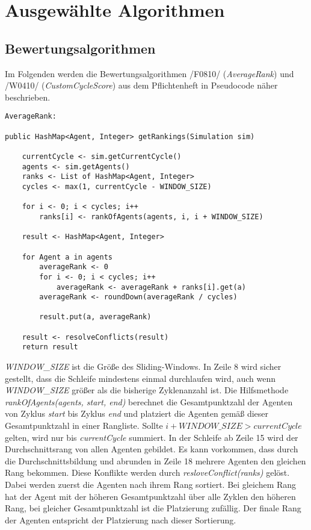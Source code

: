 \chapter{Ausgewählte Algorithmen}

\section{Bewertungsalgorithmen}

Im Folgenden werden die Bewertungsalgorithmen /F0810/ (\emph{AverageRank}) und /W0410/ (\emph{CustomCycleScore}) aus dem Pflichtenheft in Pseudocode näher beschrieben. 

\begin{lstlisting}
AverageRank:

public HashMap<Agent, Integer> getRankings(Simulation sim) 
	
	currentCycle <- sim.getCurrentCycle()
	agents <- sim.getAgents()
	ranks <- List of HashMap<Agent, Integer>	
	cycles <- max(1, currentCycle - WINDOW_SIZE)
	
	for i <- 0; i < cycles; i++ 
		ranks[i] <- rankOfAgents(agents, i, i + WINDOW_SIZE)
	
	result <- HashMap<Agent, Integer>	
	
	for Agent a in agents
		averageRank <- 0
		for i <- 0; i < cycles; i++
			averageRank <- averageRank + ranks[i].get(a)
		averageRank <- roundDown(averageRank / cycles)
		
		result.put(a, averageRank)
	
	result <- resolveConflicts(result)
	return result
\end{lstlisting}
\emph{WINDOW\_SIZE} ist die Größe des Sliding-Windows. In Zeile 8 wird sicher gestellt, dass die Schleife mindestens einmal durchlaufen wird, auch wenn \emph{WINDOW\_SIZE} größer als die bisherige Zyklenanzahl ist.
Die Hilfsmethode \emph{rankOfAgents(agents, start, end)} berechnet die Gesamtpunktzahl der Agenten von Zyklus \emph{start} bis Zyklus \emph{end} und platziert die Agenten gemäß dieser Gesamtpunktzahl in einer Rangliste. Sollte $i + WINDOW\_SIZE > currentCycle$ gelten, wird nur bis \emph{currentCycle} summiert. 
In der Schleife ab Zeile 15 wird der Durchschnittsrang von allen Agenten gebildet.
Es kann vorkommen, dass durch die Durchschnittsbildung und abrunden in Zeile 18 mehrere Agenten den gleichen Rang bekommen. Diese Konflikte werden durch \emph{resloveConflict(ranks)} gelöst. Dabei werden zuerst die Agenten nach ihrem Rang sortiert. Bei gleichem Rang hat der Agent mit der höheren Gesamtpunktzahl über alle Zyklen den höheren Rang, bei gleicher Gesamtpunktzahl ist die Platzierung zufällig. Der finale Rang der Agenten entspricht der Platzierung nach dieser Sortierung.

